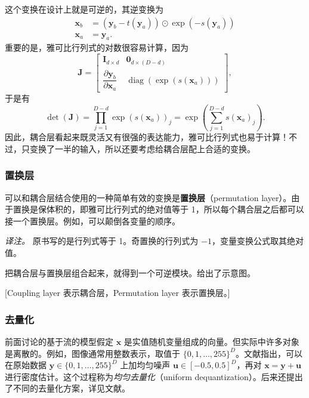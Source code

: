 这个变换在设计上就是可逆的，其逆变换为
\begin{align}
\mathbf{x}_b&=(\mathbf{y}_b-t(\mathbf{y}_a))\odot\exp(-s(\mathbf{y}_a))
\tag{4.17}\label{eq:04-17}\\
\mathbf{x}_a&=\mathbf{y}_a.
\tag{4.18}\label{eq:04-18}
\end{align}
重要的是，雅可比行列式的对数很容易计算，因为
\begin{equation}
\mathbf{J}=
\begin{bmatrix}
\mathbf{I}_{d\times d} & \mathbf{0}_{d\times(D-d)}\\
\dfrac{\partial\mathbf{y}_b}{\partial\mathbf{x}_a} & \operatorname{diag}(\exp(s(\mathbf{x}_a)))
\end{bmatrix},
\tag{4.19}\label{eq:04-19}
\end{equation}
于是有
\begin{equation}
\det(\mathbf{J})=\prod_{j=1}^{D-d}\exp(s(\mathbf{x}_a))_j
=\exp\left(\sum_{j=1}^{D-d}s(\mathbf{x}_a)_j\right).
\tag{4.20}\label{eq:04-20}
\end{equation}
因此，耦合层看起来既灵活又有很强的表达能力，雅可比行列式也易于计算！不过，只变换了一半的输入，所以还要考虑给耦合层配上合适的变换。

\subsubsection{置换层}

可以和耦合层结合使用的一种简单有效的变换是\textbf{置换层}（permutation layer）。由于置换是保体积的，即雅可比行列式的绝对值等于 1，所以每个耦合层之后都可以接一个置换层。例如，可以颠倒各变量的顺序。

\emph{译注。} 原书写的是行列式等于 1。奇置换的行列式为 $-1$，变量变换公式取其绝对值。

把耦合层与置换层组合起来，就得到一个可逆模块。给出了示意图。

[Coupling layer 表示耦合层，Permutation layer 表示置换层。]

\subsubsection{去量化}

前面讨论的基于流的模型假定 $\mathbf{x}$ 是实值随机变量组成的向量。但实际中许多对象是离散的。例如，图像通常用整数表示，取值于 $\{0,1,\ldots,255\}^D$。文献指出，可以在原始数据 $\mathbf{y}\in\{0,1,\ldots,255\}^D$ 上加均匀噪声 $\mathbf{u}\in[-0.5,0.5]^D$，再对 $\mathbf{x}=\mathbf{y}+\mathbf{u}$ 进行密度估计。这个过程称为\emph{均匀去量化}（uniform dequantization）。后来还提出了不同的去量化方案，详见文献。

